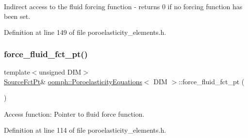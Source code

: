 Indirect access to the fluid forcing function -\/ returns 0 if no forcing function has been set. 



Definition at line 149 of file poroelasticity\+\_\+elements.\+h.

\mbox{\label{classoomph_1_1PoroelasticityEquations_a0716cc72117daf3aced6cfd1d3763204}} 
\subsubsection{\texorpdfstring{force\+\_\+fluid\+\_\+fct\+\_\+pt()}{force\_fluid\_fct\_pt()}\hspace{0.1cm}{\footnotesize\ttfamily [1/2]}}
{\footnotesize\ttfamily template$<$unsigned D\+IM$>$ \\
\hyperlink{classoomph_1_1PoroelasticityEquations_a234bc29fbd4c3255ef903a3cb5f6361f}{Source\+Fct\+Pt}\& \hyperlink{classoomph_1_1PoroelasticityEquations}{oomph\+::\+Poroelasticity\+Equations}$<$ D\+IM $>$\+::force\+\_\+fluid\+\_\+fct\+\_\+pt (\begin{DoxyParamCaption}{ }\end{DoxyParamCaption})\hspace{0.3cm}{\ttfamily [inline]}}



Access function\+: Pointer to fluid force function. 



Definition at line 114 of file poroelasticity\+\_\+elements.\+h.

\mbox{\label{classoomph_1_1PoroelasticityEquations_a2523a092b6190b733eb7c97a65587ecf}} 
